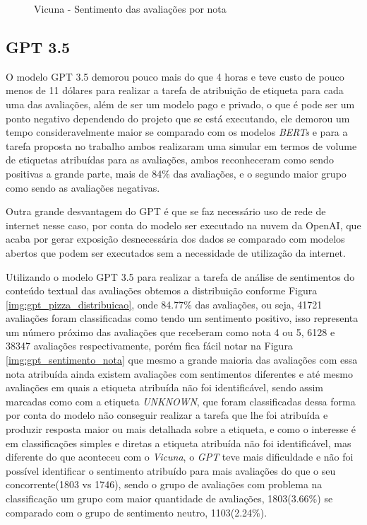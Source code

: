 \begin{figure}
\begin{minipage}{1\textwidth}
		\caption{Vicuna - Sentimento das avaliações por nota}
		\label{img:vicuna_sentimento_nota}
	\end{minipage}
\end{figure}

\subsection{GPT 3.5}
\label{sec:resultados:subsec:gpt}


O modelo GPT 3.5 demorou pouco mais do que 4 horas e teve custo de pouco menos de 11 dólares para realizar a tarefa de atribuição de etiqueta para cada uma das avaliações, além de ser um modelo pago e privado, o que é pode ser um ponto negativo dependendo do projeto que se está executando, ele demorou um tempo consideravelmente maior se comparado com os modelos \textit{BERTs} e para a tarefa proposta no trabalho ambos realizaram uma simular em termos de volume de etiquetas atribuídas para as avaliações, ambos reconheceram como sendo positivas a grande parte, mais de 84\% das avaliações, e o segundo maior grupo como sendo as avaliações negativas.

Outra grande desvantagem do GPT é que se faz necessário uso de rede de internet nesse caso, por conta do modelo ser executado na nuvem da OpenAI, que acaba por gerar exposição desnecessária dos dados se comparado com modelos abertos que podem ser executados sem a necessidade de utilização da internet.

Utilizando o modelo GPT 3.5 para realizar a tarefa de análise de sentimentos do conteúdo textual das avaliações obtemos a distribuição conforme Figura \ref{img:gpt_pizza_distribuicao}, onde 84.77\% das avaliações, ou seja, 41721 avaliações foram classificadas como tendo um sentimento positivo, isso representa um número próximo das avaliações que receberam como nota 4 ou 5, 6128 e 38347 avaliações respectivamente, porém fica fácil notar na Figura \ref{img:gpt_sentimento_nota} que mesmo a grande maioria das avaliações com essa nota atribuída ainda existem avaliações com sentimentos diferentes e até mesmo avaliações em quais a etiqueta atribuída não foi identificável, sendo assim marcadas como com a etiqueta \textit{UNKNOWN}, que foram classificadas dessa forma por conta do modelo não conseguir realizar a tarefa que lhe foi atribuída e produzir resposta maior ou mais detalhada sobre a etiqueta, e como o interesse é em classificações simples e diretas a etiqueta atribuída não foi identificável, mas diferente do que aconteceu com o \textit{Vicuna}, o \textit{GPT} teve mais dificuldade e não foi possível identificar o sentimento atribuído para mais avaliações do que o seu concorrente(1803 vs 1746), sendo o grupo de avaliações com problema na classificação um grupo com maior quantidade de avaliações, 1803(3.66\%) se comparado com o grupo de sentimento neutro, 1103(2.24\%).

